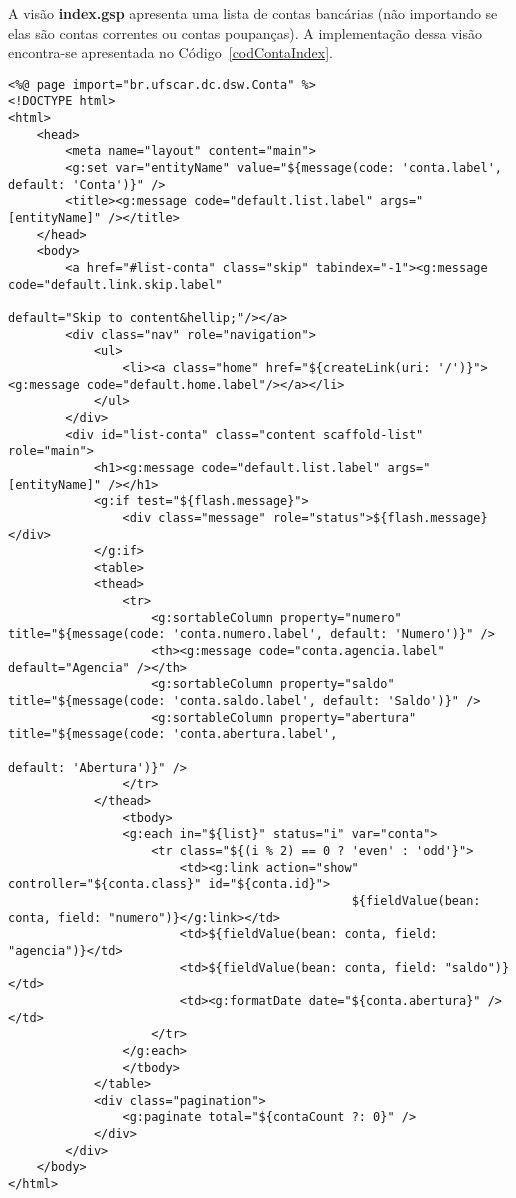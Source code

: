 \vspace{0.2cm}

A visão {\bf index.gsp} apresenta  uma lista de contas bancárias (não importando
se elas são  contas correntes ou contas poupanças).  A implementação dessa visão
encontra-se apresentada no Código~\ref{codContaIndex}. 

\vspace{0.3cm}

\begin{lstlisting}[caption=Visão  {\bf  conta/index.gsp}, frame=trBL,float=htbp,
    label=codContaIndex] 
<%@ page import="br.ufscar.dc.dsw.Conta" %>
<!DOCTYPE html>
<html>
	<head>
		<meta name="layout" content="main">
		<g:set var="entityName" value="${message(code: 'conta.label', default: 'Conta')}" />
		<title><g:message code="default.list.label" args="[entityName]" /></title>
	</head>
	<body>
		<a href="#list-conta" class="skip" tabindex="-1"><g:message code="default.link.skip.label" 
                                                                  default="Skip to content&hellip;"/></a>
		<div class="nav" role="navigation">
			<ul>
				<li><a class="home" href="${createLink(uri: '/')}"><g:message code="default.home.label"/></a></li>
			</ul>
		</div>
		<div id="list-conta" class="content scaffold-list" role="main">
			<h1><g:message code="default.list.label" args="[entityName]" /></h1>
			<g:if test="${flash.message}">
				<div class="message" role="status">${flash.message}</div>
			</g:if>
			<table>
			<thead>
				<tr>
					<g:sortableColumn property="numero" title="${message(code: 'conta.numero.label', default: 'Numero')}" />
					<th><g:message code="conta.agencia.label" default="Agencia" /></th>
					<g:sortableColumn property="saldo" title="${message(code: 'conta.saldo.label', default: 'Saldo')}" />
					<g:sortableColumn property="abertura" title="${message(code: 'conta.abertura.label', 
                                                                                     default: 'Abertura')}" />
				</tr>
			</thead>
				<tbody>
				<g:each in="${list}" status="i" var="conta">
					<tr class="${(i % 2) == 0 ? 'even' : 'odd'}">
						<td><g:link action="show" controller="${conta.class}" id="${conta.id}">
                                                ${fieldValue(bean: conta, field: "numero")}</g:link></td>
						<td>${fieldValue(bean: conta, field: "agencia")}</td>
						<td>${fieldValue(bean: conta, field: "saldo")}</td>
						<td><g:formatDate date="${conta.abertura}" /></td>
					</tr>
				</g:each>
				</tbody>
			</table>
			<div class="pagination">
				<g:paginate total="${contaCount ?: 0}" />
			</div>
		</div>
	</body>
</html>
\end{lstlisting}


